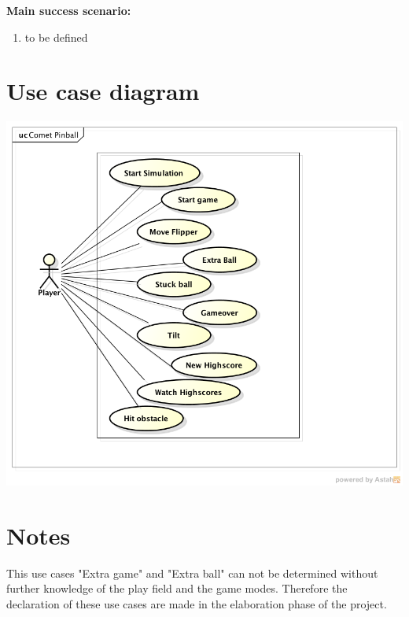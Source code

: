 \documentclass[fontsize=12pt,
               paper=a4,
               twoside=false,
               parskip=half,
               ]{scrartcl}
\begin{document}
\textbf{\textsf{Main success scenario:}}

\begin{enumerate}[leftmargin=3em]
	\item  to be defined
\end{enumerate}


\section{Use case diagram}


\includegraphics[width=15cm]{./img/usecase-model.png}

\section{Notes}
This use cases "Extra game" and "Extra ball" can not be determined without further knowledge of the play field and the game modes.
Therefore the declaration of these use cases are made in the elaboration phase of the project.	
\end{document}
